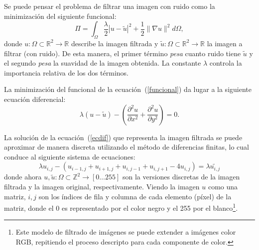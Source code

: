 \documentclass[a4paper]{article}
\begin{document}

Se puede pensar el problema de filtrar una imagen con ruido como la minimizaci\'on del siguiente funcional:
\begin{equation}
  \Pi = \int_\Omega {\frac{\lambda}{2} \left| u - \tilde{u} \right|^2 + \frac{1}{2} \lVert \nabla u \rVert^2 } d\Omega,
\label{funcional}
\end{equation}
donde $u : \Omega \subset \mathbb{R}^2 \to \mathbb{R}$ describe la imagen filtrada y
$\tilde{u} : \Omega \subset \mathbb{R}^2 \to \mathbb{R}$ la imagen a filtrar (con ruido).
De esta manera, el primer t\'ermino \emph{pesa} cuanto ruido tiene $\tilde{u}$ y el segundo \emph{pesa} la suavidad de la imagen obtenida. La constante $\lambda$ controla la importancia relativa de los dos t\'erminos.

La minimizaci\'on del funcional de la ecuaci\'on~(\ref{funcional}) da lugar a la siguiente ecuaci\'on diferencial:
\begin{equation}
 \lambda \left( u - \tilde{u} \right) - \left( \frac{\partial^2 u}{\partial x^2} + \frac{\partial^2 u}{\partial y^2} \right) = 0.
\label{ecdif}
\end{equation}

La soluci\'on de la ecuaci\'on~(\ref{ecdif}) que representa la imagen filtrada se puede aproximar de manera discreta utilizando el m\'etodo de diferencias finitas, lo cual conduce al siguiente sistema de ecuaciones:
\begin{equation}
 \lambda u_{i,j} - \left( u_{i-1,j} + u_{i+1,j} + u_{i,j-1} + u_{i,j+1} - 4 u_{i,j} \right) = \lambda \tilde{u_{i,j}}
 \label{eqlin}
\end{equation}
donde ahora $u,\tilde{u} : \Omega \subset \mathbb{Z}^2 \to [0 \dots 255]$ son la versiones discretas de la imagen filtrada y la imagen original, respectivamente. Viendo la imagen $u$ como una matriz, $i,j$ son los \'indices de fila y columna de cada elemento (p\'ixel)  de la matriz, donde el 0 es representado por el color negro y el 255 por el blanco\footnote{Este modelo de filtrado de im\'agenes se puede extender a im\'agenes color RGB, repitiendo el proceso descripto para cada componente de color.}.
\end{document}
